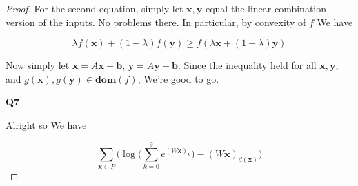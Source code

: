 \documentclass{article}
\begin{document}
\begin{proof}
			For the second equation, simply let $\mathbf{x, y}$ equal the linear combination version of the inputs. No problems there. In particular, by convexity of $f$ We have
			
			\[\lambda f(\mathbf{x}) + (1-\lambda)f(\mathbf{y}) \ge f(\lambda\mathbf{x} + (1-\lambda)\mathbf{y}) \]
			
			Now simply let $\mathbf{x} = A\mathbf{x} + \mathbf{b}$, $\mathbf{y} = A\mathbf{y} + \mathbf{b}$. Since the inequality held for all $\mathbf{x, y}$, and $g(\mathbf{x}), g(\mathbf{y})\in\mathbf{dom}(f)$, We're good to go. 
			
			
	\textbf{Q7}
	
		Alright so We have
		
		\[ \sum_{\mathbf{x}\in P} \bigg( \log\bigg(\sum^9_{k=0} e^{(W\mathbf{x})_k} \bigg) - (W\mathbf{x})_{d(\mathbf{x})} \bigg) \]
			
			
			
			
			
			
			
			
		\end{proof}
		
		
		
\end{document}
